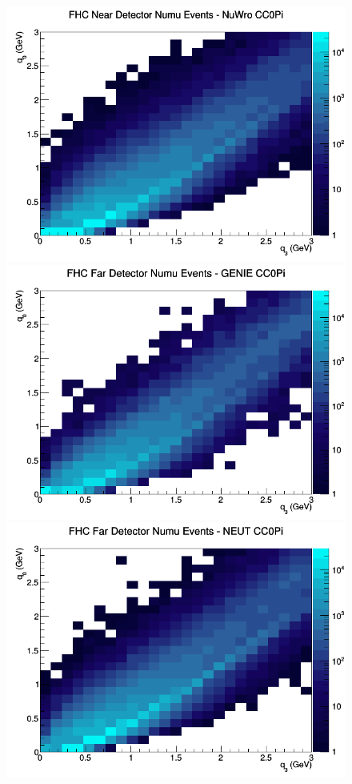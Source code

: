 \begin{figure}[h]
\includegraphics[width=\linewidth]{eff_q0_q3/GAr/CC0Pi_FHC_ND_numu_q3_q0_NuWro.png}
\endminipage
\newline
{}
\includegraphics[width=\linewidth]{eff_q0_q3/GAr/CC0Pi_FHC_FD_numu_q3_q0_GENIE.png}
\endminipage
{}
\includegraphics[width=\linewidth]{eff_q0_q3/GAr/CC0Pi_FHC_FD_numu_q3_q0_NEUT.png}

\end{figure}
